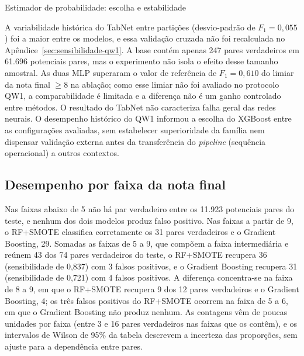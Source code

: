 \begin{chapter}{Estimador de probabilidade: escolha e estabilidade}


A variabilidade histórica do TabNet entre partições (desvio-padrão de $F_1 = 0{,}055$) foi a maior entre os modelos, e essa validação cruzada não foi recalculada no Apêndice~\ref{sec:sensibilidade-qw1}. A base contém apenas 247 pares verdadeiros em 61.696 potenciais pares, mas o experimento não isola o efeito desse tamanho amostral. As duas MLP superaram o valor de referência de $F_1 = 0{,}610$ do limiar da nota final $\geq 8$ na ablação; como esse limiar não foi avaliado no protocolo QW1, a comparabilidade é limitada e a diferença não é um ganho controlado entre métodos. O resultado do TabNet não caracteriza falha geral das redes neurais. O desempenho histórico do QW1 informou a escolha do XGBoost entre as configurações avaliadas, sem estabelecer superioridade da família nem dispensar validação externa antes da transferência do \textit{pipeline} (sequência operacional) a outros contextos.

\subsection{Desempenho por faixa da nota final}\label{sec:e2-resultados-faixas}



Nas faixas abaixo de 5 não há par verdadeiro entre os 11.923 potenciais pares do teste, e nenhum dos dois modelos produz falso positivo. Nas faixas a partir de 9, o RF+SMOTE classifica corretamente os 31 pares verdadeiros e o Gradient Boosting, 29. Somadas as faixas de 5 a 9, que compõem a faixa intermediária e reúnem 43 dos 74 pares verdadeiros do teste, o RF+SMOTE recupera 36 (sensibilidade de 0,837) com 3 falsos positivos, e o Gradient Boosting recupera 31 (sensibilidade de 0,721) com 4 falsos positivos. A diferença concentra-se na faixa de 8 a 9, em que o RF+SMOTE recupera 9 dos 12 pares verdadeiros e o Gradient Boosting, 4; os três falsos positivos do RF+SMOTE ocorrem na faixa de 5 a 6, em que o Gradient Boosting não produz nenhum. As contagens vêm de poucas unidades por faixa (entre 3 e 16 pares verdadeiros nas faixas que os contêm), e os intervalos de Wilson de 95\% da tabela descrevem a incerteza das proporções, sem ajuste para a dependência entre pares.


\end{chapter}

